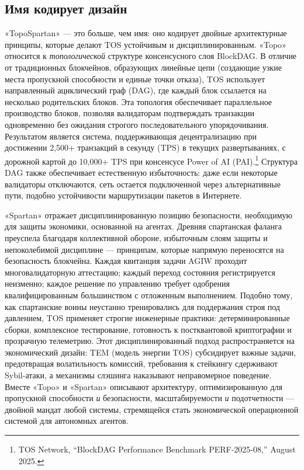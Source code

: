 \documentclass[11pt]{article}
\begin{document}
\subsection{Имя кодирует дизайн}
«TopoSpartan» — это больше, чем имя: оно кодирует двойные архитектурные принципы, которые делают TOS устойчивым и дисциплинированным. «Topo» относится к \emph{топологической} структуре консенсусного слоя BlockDAG. В отличие от традиционных блокчейнов, образующих линейные цепи (создающие узкие места пропускной способности и единые точки отказа), TOS использует направленный ациклический граф (DAG), где каждый блок ссылается на несколько родительских блоков. Эта топология обеспечивает параллельное производство блоков, позволяя валидаторам подтверждать транзакции одновременно без ожидания строгого последовательного упорядочивания. Результатом является система, поддерживающая децентрализацию при достижении 2,500+ транзакций в секунду (TPS) в текущих развертываниях, с дорожной картой до 10,000+ TPS при консенсусе Power of AI (PAI).\footnote{TOS Network, ``BlockDAG Performance Benchmark PERF-2025-08,'' August 2025.} Структура DAG также обеспечивает естественную избыточность: даже если некоторые валидаторы отключаются, сеть остается подключенной через альтернативные пути, подобно устойчивости маршрутизации пакетов в Интернете.

«Spartan» отражает дисциплинированную позицию безопасности, необходимую для защиты экономики, основанной на агентах. Древняя спартанская фаланга преуспела благодаря коллективной обороне, избыточным слоям защиты и непоколебимой дисциплине — принципам, которые напрямую переносятся на безопасность блокчейна. Каждая квитанция задачи AGIW проходит многовалидаторную аттестацию; каждый переход состояния регистрируется неизменно; каждое решение по управлению требует одобрения квалифицированным большинством с отложенным выполнением. Подобно тому, как спартанские воины неустанно тренировались для поддержания строя под давлением, TOS применяет строгие инженерные практики: детерминированные сборки, комплексное тестирование, готовность к постквантовой криптографии и прозрачную телеметрию. Этот дисциплинированный подход распространяется на экономический дизайн: TEM (модель энергии TOS) субсидирует важные задачи, предотвращая волатильность комиссий, требования к стейкингу сдерживают Sybil-атаки, а механизмы слэшинга наказывают неправомерное поведение. Вместе «Topo» и «Spartan» описывают архитектуру, оптимизированную для пропускной способности \emph{и} безопасности, масштабируемости \emph{и} подотчетности — двойной мандат любой системы, стремящейся стать экономической операционной системой для автономных агентов.
\end{document}
